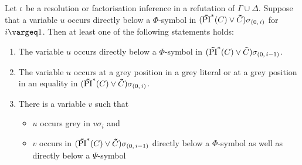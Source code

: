 \documentclass[%
	draft=false,%
	numbers=noendperiod,%
	11pt,%
	a4paper,%
	oneside,%
	openany,%
]{memoir}
\begin{document}
\begin{lemma}
	\label{lemma:var_below_phi_symbol}
	Let $\iota$ be a resolution or factorisation inference in a refutation of $\Gamma\cup\Delta$.
	Suppose that a variable $u$ occurs directly below a $\Phi$-symbol in $(\bm\tilde{\operatorname{PI}}^{*}(C)\lor \bm\tilde{C})\sigma_{(0,\,i)}$ for $i\vargeq 1$.
	Then at least one of the following statements holds:
	\begin{enumerate}
		\item
			\label{14_1}
			The variable $u$ occurs directly below a $\Phi$-symbol in $(\bm\tilde{\operatorname{PI}}^{*}(C)\lor \bm\tilde{C})\sigma_{(0,\,i-1)}$.

		\item
			\label{14_5}
			The variable $u$ occurs at a grey position in a grey literal or at a grey position in an equality in $(\bm\tilde{\operatorname{PI}}^{*}(C)\lor \bm\tilde{C})\sigma_{(0,\,i)}$.

		\item 
			\label{14_2}
			There is a variable $v$ such that 
			{
				\renewcommand{\labelitemi}{\textendash}
				\begin{itemize}
					\item $u$ occurs grey in $v\sigma_i$ and
					\item $v$ occurs in $(\bm\tilde{\operatorname{PI}}^{*}(C)\lor \bm\tilde{C})\sigma_{(0,\,i-1)}$ directly below a $\Phi$-symbol as well as directly below a $\Psi$-symbol
				\end{itemize}
			}

	\end{enumerate}
\end{lemma}
\end{document}
